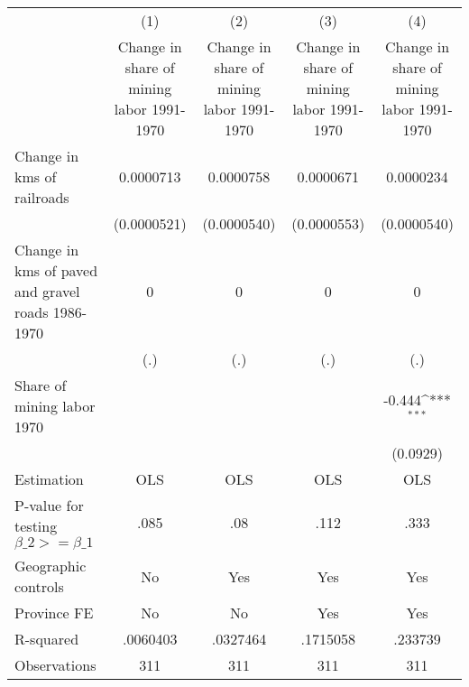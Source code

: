 {
\def\sym#1{\ifmmode^{#1}\else\(^{#1}\)\fi}
\begin{tabular}{l*{4}{c}}
\hline\hline
                &\multicolumn{1}{c}{(1)}&\multicolumn{1}{c}{(2)}&\multicolumn{1}{c}{(3)}&\multicolumn{1}{c}{(4)}\\
                &\multicolumn{1}{c}{Change in share of mining labor 1991-1970}&\multicolumn{1}{c}{Change in share of mining labor 1991-1970}&\multicolumn{1}{c}{Change in share of mining labor 1991-1970}&\multicolumn{1}{c}{Change in share of mining labor 1991-1970}\\
\hline
Change in kms of railroads&0.0000713         &0.0000758         &0.0000671         &0.0000234         \\
                &(0.0000521)         &(0.0000540)         &(0.0000553)         &(0.0000540)         \\
[1em]
Change in kms of paved and gravel roads 1986-1970&        0         &        0         &        0         &        0         \\
                &      (.)         &      (.)         &      (.)         &      (.)         \\
[1em]
Share of mining labor 1970&                  &                  &                  &   -0.444\sym{***}\\
                &                  &                  &                  & (0.0929)         \\
\hline
Estimation      &      OLS         &      OLS         &      OLS         &      OLS         \\
P-value for testing $\beta\_2 >= \beta\_1$&     .085         &      .08         &     .112         &     .333         \\
Geographic controls&       No         &      Yes         &      Yes         &      Yes         \\
Province FE     &       No         &       No         &      Yes         &      Yes         \\
R-squared       & .0060403         & .0327464         & .1715058         &  .233739         \\
Observations    &      311         &      311         &      311         &      311         \\
\hline\hline
\end{tabular}
}
